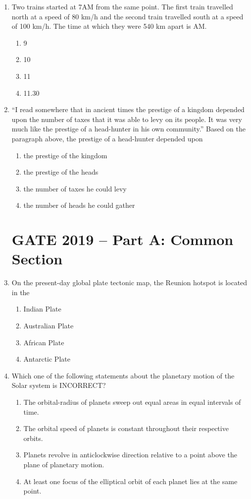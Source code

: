 \documentclass[journal,12pt,onecolumn]{IEEEtran}
\theoremstyle{remark}
\begin{document}
\begin{enumerate}[resume]
\item Two trains started at 7AM from the same point. The first train travelled north at a speed of 80 km/h and the second train travelled south at a speed of 100 km/h. The time at which they were 540 km apart is AM.

\begin{multicols}{4}
\begin{enumerate}
\item 9  
\item 10  
\item 11  
\item 11.30  
\end{enumerate}
\end{multicols}

\item ``I read somewhere that in ancient times the prestige of a kingdom depended upon the number of taxes that it was able to levy on its people. It was very much like the prestige of a head-hunter in his own community.''  
Based on the paragraph above, the prestige of a head-hunter depended upon

\begin{enumerate}
\item the prestige of the kingdom  
\item the prestige of the heads  
\item the number of taxes he could levy  
\item the number of heads he could gather  
\end{enumerate}
\newpage

\section*{GATE 2019 -- Part A: Common Section}

\item On the present-day global plate tectonic map, the Reunion hotspot is located in the  
\begin{multicols}{2}
\begin{enumerate}
\item Indian Plate
\item Australian Plate
\item African Plate
\item Antarctic Plate
\end{enumerate}
\end{multicols}

\item Which one of the following statements about the planetary motion of the Solar system is INCORRECT?  
\begin{enumerate}
\item The orbital-radius of planets sweep out equal areas in equal intervals of time.
\item The orbital speed of planets is constant throughout their respective orbits.
\item Planets revolve in anticlockwise direction relative to a point above the plane of planetary motion.
\item At least one focus of the elliptical orbit of each planet lies at the same point.
\end{enumerate}


\end{enumerate}
\end{document}
